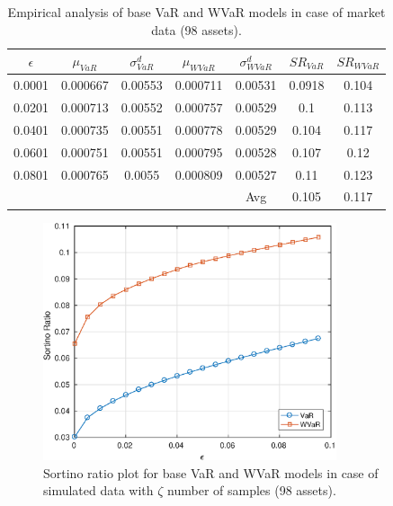 \documentclass[12pt]{article}
\numberwithin{equation}{section}
\begin{document}
\begin{table}[!h]
\centering
\captionsetup{justification=centering}
\begin{tabular}{||c|c|c|c|c|c|c||}
\hline
$\epsilon$ & $\mu_{VaR}$ & $\sigma_{VaR}^{d}$ & $\mu_{WVaR}$ & $\sigma_{WVaR}^{d}$ & $SR_{VaR}$ & $SR_{WVaR}$\\
\hline
0.0001 & 0.000667 & 0.00553 & 0.000711 & 0.00531 & 0.0918 & 0.104 \\
0.0201 & 0.000713 & 0.00552 & 0.000757 & 0.00529 & 0.1 & 0.113 \\
0.0401 & 0.000735 & 0.00551 & 0.000778 & 0.00529 & 0.104 & 0.117 \\
0.0601 & 0.000751 & 0.00551 & 0.000795 & 0.00528 & 0.107 & 0.12 \\
0.0801 & 0.000765 & 0.0055 & 0.000809 & 0.00527 & 0.11 & 0.123 \\
\hline
& & & & Avg & 0.105 & 0.117 \\
\hline
\end{tabular}
\caption{Empirical analysis of base VaR and WVaR models in case of market data (98 assets).}
\label{tab:5.4}
\end{table}

\begin{figure}[!h]
\centering
\includegraphics[height=7.0cm]{var_100s_exact.eps}
\caption{Sortino ratio plot for base VaR and WVaR models in case of simulated data with $\zeta$ number of samples (98 assets).}
\label{fig:5.5}
\end{figure}
\end{document}
